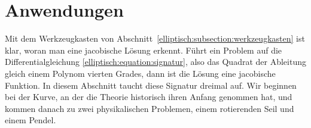 %
%
%
%
\section{Anwendungen
\label{elliptisch:section:anwendungen}}

Mit dem Werkzeugkasten von
Abschnitt~\ref{elliptisch:subsection:werkzeugkasten} ist klar, woran
man eine jacobische Lösung erkennt.
Führt ein Problem auf die Differentialgleichung
\eqref{elliptisch:equation:signatur}, also das Quadrat der Ableitung
gleich einem Polynom vierten Grades, dann ist die Lösung eine
jacobische Funktion.
In diesem Abschnitt taucht diese Signatur dreimal auf.
Wir beginnen bei der Kurve, an der die Theorie historisch ihren
Anfang genommen hat, und kommen danach zu zwei physikalischen
Problemen, einem rotierenden Seil und einem Pendel.

